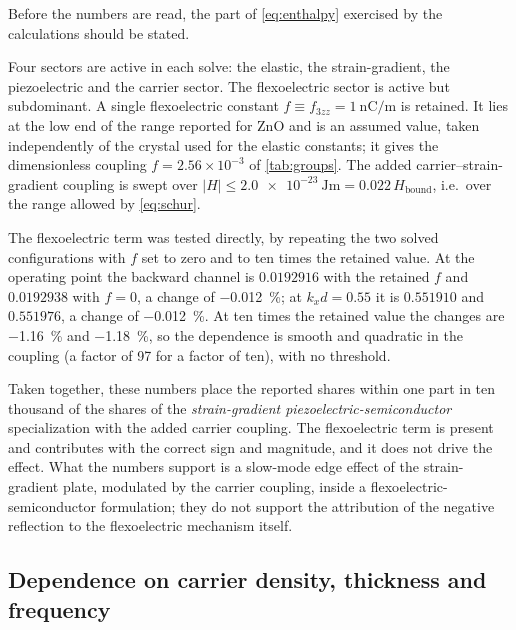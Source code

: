 Before the numbers are read, the part of \eqref{eq:enthalpy} exercised by the calculations should be stated.

Four sectors are active in each solve: the elastic, the strain-gradient, the
piezoelectric and the carrier sector.  The flexoelectric sector is active but
subdominant.  A single flexoelectric constant $f\equiv f_{3zz}=\SI{1}{\nano
\coulomb\per\metre}$ is retained.  It lies at the low end of the range
reported for ZnO \cite{hu2025computational,zhao2021effects} and is an assumed value, taken independently of the
crystal used for the elastic constants; it gives the dimensionless
coupling $f=2.56\times10^{-3}$ of \cref{tab:groups}.  The added
carrier--strain-gradient coupling is swept over
$|H|\le\SI{2.0e-23}{\joule\metre}=0.022\,H_{\text{bound}}$, i.e.\ over the
range allowed by \eqref{eq:schur}.

The flexoelectric term was tested directly, by repeating the two solved configurations with $f$ set to zero and to ten times
the retained value.  At the
operating point the backward
channel is $0.0192916$ with the retained $f$ and $0.0192938$ with $f=0$, a
change of \SI{-0.012}{\percent}; at $k_xd=0.55$ it is $0.551910$ and
$0.551976$, a change of \SI{-0.012}{\percent}.  At ten times the retained value the changes
are \SI{-1.16}{\percent} and \SI{-1.18}{\percent}, so the dependence is smooth
and quadratic in the coupling (a factor of 97 for a factor of ten), with no threshold.

Taken together, these numbers place the reported shares within one part in ten
thousand of the shares of the \emph{strain-gradient
piezoelectric-semiconductor} specialization with the added carrier coupling.
The flexoelectric term is present and contributes with the correct sign and
magnitude, and it does not drive the effect.  What the numbers support is a
slow-mode edge effect of the strain-gradient plate, modulated by the carrier
coupling, inside a flexoelectric-semiconductor formulation; they do not support
the attribution of the negative reflection to the flexoelectric mechanism
itself.

\subsection{Dependence on carrier density, thickness and frequency}
\label{sec:results_material}
\label{sec:results_geometry}
\label{sec:results_frequency}

